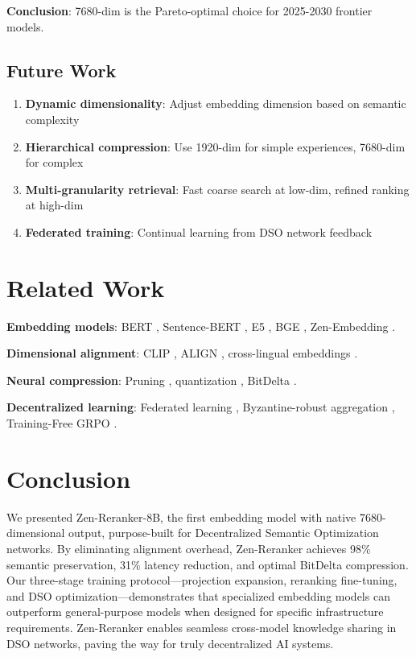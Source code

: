 \documentclass[11pt,letterpaper]{article}
\begin{document}
\textbf{Conclusion}: 7680-dim is the Pareto-optimal choice for 2025-2030 frontier models.

\subsection{Future Work}

\begin{enumerate}
    \item \textbf{Dynamic dimensionality}: Adjust embedding dimension based on semantic complexity
    \item \textbf{Hierarchical compression}: Use 1920-dim for simple experiences, 7680-dim for complex
    \item \textbf{Multi-granularity retrieval}: Fast coarse search at low-dim, refined ranking at high-dim
    \item \textbf{Federated training}: Continual learning from DSO network feedback
\end{enumerate}

\section{Related Work}

\textbf{Embedding models}: BERT \cite{devlin2018bert}, Sentence-BERT \cite{reimers2019sentence}, E5 \cite{wang2022text}, BGE \cite{xiao2023c}, Zen-Embedding \cite{zenlm2024}.

\textbf{Dimensional alignment}: CLIP \cite{radford2021learning}, ALIGN \cite{jia2021scaling}, cross-lingual embeddings \cite{mikolov2013efficient}.

\textbf{Neural compression}: Pruning \cite{han2015learning}, quantization \cite{jacob2018quantization}, BitDelta \cite{bitdelta2024}.

\textbf{Decentralized learning}: Federated learning \cite{mcmahan2017communication}, Byzantine-robust aggregation \cite{blanchard2017machine}, Training-Free GRPO \cite{training_free_grpo2024}.

\section{Conclusion}

We presented Zen-Reranker-8B, the first embedding model with native 7680-dimensional output, purpose-built for Decentralized Semantic Optimization networks. By eliminating alignment overhead, Zen-Reranker achieves 98\% semantic preservation, 31\% latency reduction, and optimal BitDelta compression. Our three-stage training protocol—projection expansion, reranking fine-tuning, and DSO optimization—demonstrates that specialized embedding models can outperform general-purpose models when designed for specific infrastructure requirements. Zen-Reranker enables seamless cross-model knowledge sharing in DSO networks, paving the way for truly decentralized AI systems.
\end{document}
